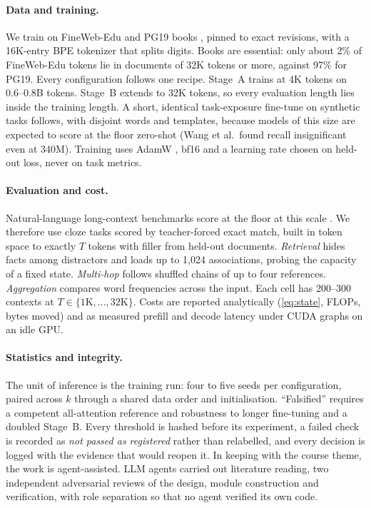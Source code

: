 \documentclass[10pt,a4paper]{article}
\begin{document}
\paragraph{Data and training.} We train on FineWeb-Edu \citep{penedo2024fineweb} and PG19 books
\citep{rae2020compressive}, pinned to exact revisions, with a 16K-entry BPE tokenizer that splits digits.
Books are essential: only about 2\% of FineWeb-Edu tokens lie in documents of 32K tokens or more,
against 97\% for PG19. Every configuration follows one recipe. Stage~A trains at 4K tokens on 0.6--0.8B tokens.
Stage~B extends to 32K tokens, so every evaluation length lies inside the training length. A short,
identical task-exposure fine-tune on synthetic tasks follows, with disjoint words and templates, because models of
this size are expected to score at the floor zero-shot (Wang et al.\ found recall insignificant even at 340M). Training uses AdamW \citep{loshchilov2019adamw},
bf16 and a learning rate chosen on held-out loss, never on task metrics.

\paragraph{Evaluation and cost.} Natural-language long-context benchmarks score at the floor at this
scale \citep{hsieh2024ruler}. We therefore use cloze tasks scored by teacher-forced exact match, built in
token space to exactly $T$ tokens with filler from held-out documents. \emph{Retrieval} hides facts among
distractors and loads up to 1,024 associations, probing the capacity of a fixed state. \emph{Multi-hop} follows
shuffled chains of up to four references. \emph{Aggregation} compares word frequencies across the input. Each
cell has 200--300 contexts at $T\in\{1\text{K},\dots,32\text{K}\}$. Costs are reported analytically (\cref{eq:state},
FLOPs, bytes moved) and as measured prefill and decode latency under CUDA graphs on an idle GPU.

\paragraph{Statistics and integrity.} The unit of inference is the training run: four to five seeds per
configuration, paired across $k$ through a shared data order and initialisation. ``Falsified'' requires
a competent all-attention reference and robustness to longer fine-tuning and a doubled Stage~B. Every
threshold is hashed before its experiment, a failed check is recorded as \emph{not passed as registered}
rather than relabelled, and every decision is logged with the evidence that would reopen it. In keeping
with the course theme, the work is agent-assisted. LLM agents carried out literature reading, two
independent adversarial reviews of the design, module construction and verification, with role
separation so that no agent verified its own code.
\end{document}
